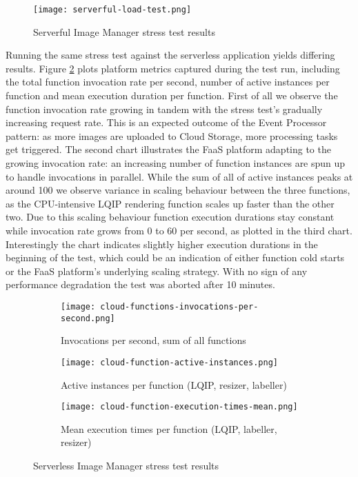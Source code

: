 \begin{figure}[h]
  \centering
  \texttt{[image: serverful-load-test.png]}
  \caption{Serverful Image Manager stress test results}
  \label{fig:serverfulStressTest}
\end{figure}

Running the same stress test against the serverless application yields differing results. Figure \ref{fig:serverlessStressTest} plots platform metrics captured during the test run, including the total function invocation rate per second, number of active instances per function and mean execution duration per function. First of all we observe the function invocation rate growing in tandem with the stress test's gradually increasing request rate. This is an expected outcome of the Event Processor pattern: as more images are uploaded to Cloud Storage, more processing tasks get triggered. The second chart illustrates the FaaS platform adapting to the growing invocation rate: an increasing number of function instances are spun up to handle invocations in parallel. While the sum of all of active instances peaks at around 100 we observe variance in scaling behaviour between the three functions, as the CPU-intensive LQIP rendering function scales up faster than the other two. Due to this scaling behaviour function execution durations stay constant while invocation rate grows from 0 to 60 per second, as plotted in the third chart. Interestingly the chart indicates slightly higher execution durations in the beginning of the test, which could be an indication of either function cold starts or the FaaS platform's underlying scaling strategy. With no sign of any performance degradation the test was aborted after 10 minutes.


\begin{figure}[h]
  \centering
  \begin{subfigure}[b]{0.75\textwidth}
      \texttt{[image: cloud-functions-invocations-per-second.png]}
      \caption{Invocations per second, sum of all functions}
  \end{subfigure}

  \begin{subfigure}[b]{0.75\textwidth}
      \texttt{[image: cloud-function-active-instances.png]}
      \caption{Active instances per function ({\color{gcpgreen}LQIP}, {\color{gcporange}resizer}, {\color{gcpred}labeller})}
  \end{subfigure}

  \begin{subfigure}[b]{0.75\textwidth}
      \texttt{[image: cloud-function-execution-times-mean.png]}
      \caption{Mean execution times per function ({\color{gcporange}LQIP}, {\color{gcpgreen}labeller}, {\color{gcpblue}resizer})}
  \end{subfigure}
  \caption{Serverless Image Manager stress test results}\label{fig:serverlessStressTest}
\end{figure}

